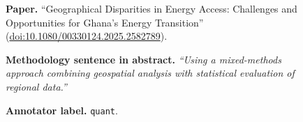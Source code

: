 %

\begin{figure}[t]
  \centering

  \textbf{Paper.} ``Geographical Disparities in Energy Access: Challenges and Opportunities for Ghana's Energy Transition''
  (\href{https://doi.org/10.1080/00330124.2025.2582789}{doi:10.1080/00330124.2025.2582789}).

  \smallskip
  \textbf{Methodology sentence in abstract.} \emph{``Using a mixed-methods approach combining geospatial analysis with statistical evaluation of regional data.''}

  \smallskip
  \textbf{Annotator label.} \texttt{quant}.

  \medskip


\end{figure}
